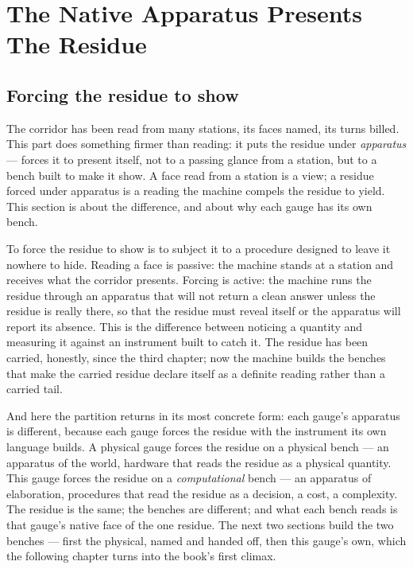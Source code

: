 \chapter{The Native Apparatus Presents The Residue}

\section{Forcing the residue to show}

The corridor has been read from many stations, its faces named, its turns billed. This part does something firmer than
reading: it puts the residue under \emph{apparatus} --- forces it to present itself, not to a passing glance from a
station, but to a bench built to make it show. A face read from a station is a view; a residue forced under apparatus is
a reading the machine compels the residue to yield. This section is about the difference, and about why each gauge has
its own bench.

To force the residue to show is to subject it to a procedure designed to leave it nowhere to hide. Reading a face is
passive: the machine stands at a station and receives what the corridor presents. Forcing is active: the machine runs the
residue through an apparatus that will not return a clean answer unless the residue is really there, so that the residue
must reveal itself or the apparatus will report its absence. This is the difference between noticing a quantity and
measuring it against an instrument built to catch it. The residue has been carried, honestly, since the third chapter;
now the machine builds the benches that make the carried residue declare itself as a definite reading rather than a
carried tail.

And here the partition returns in its most concrete form: each gauge's apparatus is different, because each gauge forces
the residue with the instrument its own language builds. A physical gauge forces the residue on a physical bench --- an
apparatus of the world, hardware that reads the residue as a physical quantity. This gauge forces the residue on a
\emph{computational} bench --- an apparatus of elaboration, procedures that read the residue as a decision, a cost, a
complexity. The residue is the same; the benches are different; and what each bench reads is that gauge's native face of
the one residue. The next two sections build the two benches --- first the physical, named and handed off, then this
gauge's own, which the following chapter turns into the book's first climax.

